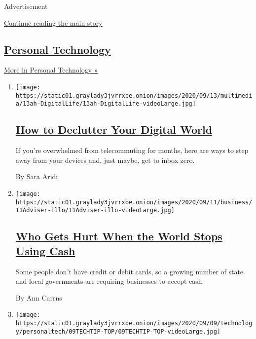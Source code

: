 Advertisement

\protect\hyperlink{after-mid1}{Continue reading the main story}

\hypertarget{personal-technology}{%
\subsection{\texorpdfstring{\href{/section/technology/personaltech}{Personal
Technology}}{Personal Technology}}\label{personal-technology}}

\href{/section/technology/personaltech}{More in Personal Technology »}

\begin{enumerate}
\def\labelenumi{\arabic{enumi}.}
\item
  \texttt{[image: https://static01.graylady3jvrrxbe.onion/images/2020/09/13/multimedia/13ah-DigitalLife/13ah-DigitalLife-videoLarge.jpg]}

  \hypertarget{how-to-declutter-your-digital-world}{%
  \subsection{\texorpdfstring{\href{/2020/09/12/at-home/declutter-your-digital-world.html}{How
  to Declutter Your Digital
  World}}{How to Declutter Your Digital World}}\label{how-to-declutter-your-digital-world}}

  If you're overwhelmed from telecommuting for months, here are ways to
  step away from your devices and, just maybe, get to inbox zero.

  By Sara Aridi
\item
  \texttt{[image: https://static01.graylady3jvrrxbe.onion/images/2020/09/11/business/11Adviser-illo/11Adviser-illo-videoLarge.jpg]}

  \hypertarget{who-gets-hurt-when-the-world-stops-using-cash}{%
  \subsection{\texorpdfstring{\href{/2020/09/11/your-money/cash-credit-cards-coronavirus.html}{Who
  Gets Hurt When the World Stops Using
  Cash}}{Who Gets Hurt When the World Stops Using Cash}}\label{who-gets-hurt-when-the-world-stops-using-cash}}

  Some people don't have credit or debit cards, so a growing number of
  state and local governments are requiring businesses to accept cash.

  By Ann Carrns
\item
  \texttt{[image: https://static01.graylady3jvrrxbe.onion/images/2020/09/09/technology/personaltech/09TECHTIP-TOP/09TECHTIP-TOP-videoLarge.jpg]}


\end{enumerate}
